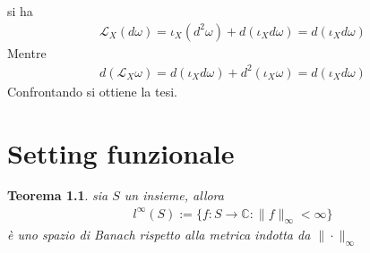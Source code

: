 \documentclass[twoside, 11pt]{amsbook}
\makeatletter
\newcommand{\0}{{(0)}}
\newcommand{\3}{{(3)}}
\theoremstyle{colonplain}
\newtheorem{thm}{Teorema}[chapter]
\theoremstyle{colondefinition}
\theoremstyle{colonremark}
\numberwithin{equation}{chapter}
\renewcommand{\proofname}{Dimostrazione}
\renewenvironment{proof}[1][\proofname]{\par
  \pushQED{\qed}%
  \normalfont \topsep6\p@\@plus6\p@\relax
  \trivlist
  \item[\hskip\labelsep\bfseries #1:]\ignorespaces
}{%
  \popQED\endtrivlist\@endpefalse
}
\makeatother
\begin{document}
\begin{proof} si ha
\begin{align}
    \mathcal{L}_X(d\omega) = \iota_X(d^2\omega) + d(\iota_X d\omega) = d(\iota_X d\omega)
\end{align}
Mentre
\begin{align}
    d\left(\mathcal{L}_X\omega\right) = d(\iota_X d\omega) + d^2(\iota_X \omega) = d(\iota_X d\omega)
\end{align}
Confrontando si ottiene la tesi. \end{proof}

\chapter{Setting funzionale}\label{SBanach}
\begin{thm} sia $S$ un insieme, allora
\begin{align}
    l^\infty(S) := \{f : S \longrightarrow \mathbb{C} : \|f\|_\infty < \infty\} 
\end{align}
è uno spazio di Banach rispetto alla metrica indotta da $\|\cdot\|_\infty$
\end{thm}
\end{document}
